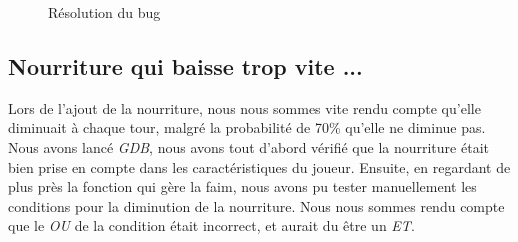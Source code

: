 \documentclass[11pt]{report}
\begin{document}
	\newpage

			\begin{figure}[ht]
			    \centering
			    \qquad
			    \caption{Résolution du bug}%
			\end{figure}
		
		\newpage
	\subsection*{Nourriture qui baisse trop vite ...}
		Lors de l'ajout de la nourriture, nous nous sommes vite rendu compte qu'elle diminuait à chaque tour, malgré la probabilité de 70\% qu'elle ne diminue pas. Nous avons lancé \emph{GDB}, nous avons tout d'abord vérifié que la nourriture était bien prise en compte dans les caractéristiques du joueur. Ensuite, en regardant de plus près la fonction qui gère la faim, nous avons pu tester manuellement les conditions pour la diminution de la nourriture. Nous nous sommes rendu compte que le \emph{OU} de la condition était incorrect, et aurait du être un \emph{ET}.
		
\end{document}
